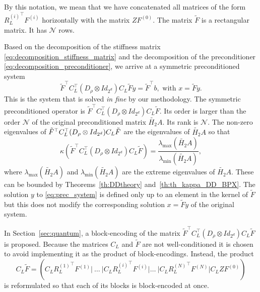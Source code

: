 \documentclass[onefignum,onetabnum]{siamart251216}
\newcommand{\Htwo}{H_2}
\newcommand{\Htwoap}{\widetilde{\Htwo}}
\begin{document}
By this notation, we mean that we have concatenated all matrices of the form ${R_L^{(i)}}^\top F^{(i)}$ horizontally with the matrix $Z F^{(0)}$. The matrix $\tilde{F}$ is a rectangular matrix. It has $\mathcal N$ rows.

Based on the decomposition of the stiffness matrix \cref{eq:decomposition_stiffness_matrix} and the decomposition of the preconditioner \cref{eq:decomposition_preconditioner}, we arrive at a symmetric preconditioned system 
\begin{equation}
    \tilde{F}^\top C_L^\top (D_{\rho} \otimes Id_{2^d}) C_L \tilde{F} y = \tilde{F}^\top b , \text{ with } x=\tilde{F} y.
    \label{eq:prec_system}
\end{equation}
This is the system that is solved \textit{in fine} by our methodology. The symmetric preconditioned operator is $\tilde{F}^\top C_L^\top (D_{\rho} \otimes Id_{2^d}) C_L \tilde{F}$. Its order is larger than the order $\mathcal N$ of the original preconditioned matrix $\Htwoap A$. Its rank is $\mathcal N$. The non-zero eigenvalues of $\Tilde{F}^\top C_L^\top (D_{\rho} \otimes Id_{2^d}) C_L \tilde{F}$ are the eigenvalues of $\Htwoap A$ so that 
\[
\kappa(\tilde{F}^\top C_L^\top (D_{\rho} \otimes Id_{2^d}) C_L \tilde{F}) = \frac{\lambda_{\max}(\Htwoap A)}{\lambda_{\min}(\Htwoap A)},
\]
where $\lambda_{\max}(\Htwoap A)$ and $\lambda_{\min}(\Htwoap A)$ are the extreme eigenvalues of $\Htwoap A$. These can be bounded by Theorems~\ref{th:DDtheory} and~\ref{th:th_kappa_DD_BPX}. 
The solution $y$ to \eqref{eq:prec_system} is defined only up to an element in the kernel of $\tilde{F}$ but this does not modify the corresponding solution $x = \tilde{F} y$ of the original system.

In Section~\ref{sec:quantum}, a block-encoding of the matrix $\tilde{F}^\top C_L^\top (D_{\rho} \otimes Id_{2^d}) C_L \tilde{F}$ is proposed. Because the matrices $C_L$ and $\tilde{F}$ are not well-conditioned it is chosen to avoid implementing it as the product of block-encodings. Instead, the product 
\[
C_L \tilde{F} = \left(C_L {R_L^{(1)}}^\top F^{(1)} | ~\dots~| C_L{R_L^{(i)}}^\top F^{(i)} | \dots~ | C_L{R_L^{(N)}}^\top F^{(N)} | C_L Z F^{(0)} \right) 
\]
is reformulated so that each of its blocks is block-encoded at once. 
\end{document}

